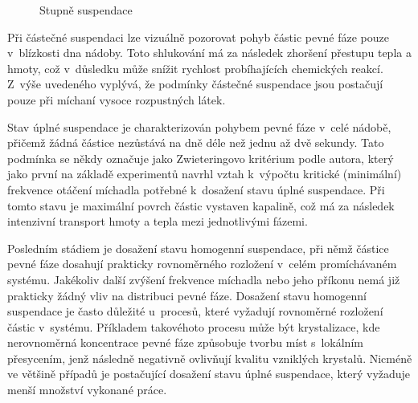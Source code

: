 \begin{figure}[h!]
  \qquad
  \caption{Stupně suspendace}
  \label{fig:typsus}
\end{figure}

Při částečné suspendaci lze vizuálně pozorovat pohyb částic pevné fáze pouze v~blízkosti dna nádoby. Toto shlukování má za následek zhoršení přestupu tepla a hmoty, což v~důsledku může snížit rychlost probíhajících chemických reakcí. Z~výše uvedeného vyplývá, že podmínky částečné suspendace jsou postačují pouze při míchaní vysoce rozpustných látek.

Stav úplné suspendace je charakterizován pohybem pevné fáze v~celé nádobě, přičemž žádná částice nezůstává na dně déle než jednu až dvě sekundy. Tato podmínka se někdy označuje jako Zwieteringovo kritérium podle autora, který jako první na základě experimentů navrhl vztah k~výpočtu kritické (minimální) frekvence otáčení míchadla potřebné k~dosažení stavu úplné suspendace. Při tomto stavu je maximální povrch částic vystaven kapalině, což má za následek intenzivní transport hmoty a tepla mezi jednotlivými fázemi.

Posledním stádiem je dosažení stavu homogenní suspendace, při němž částice pevné fáze dosahují prakticky rovnoměrného rozložení v~celém promíchávaném systému. Jakékoliv další zvýšení frekvence míchadla nebo jeho příkonu nemá již prakticky žádný vliv na distribuci pevné fáze. Dosažení stavu homogenní suspendace je často důležité u~procesů, které vyžadují rovnoměrné rozložení částic v~systému. Příkladem takovéhoto procesu může být krystalizace, kde nerovnoměrná koncentrace pevné fáze způsobuje tvorbu míst s~lokálním přesycením, jenž následně negativně ovlivňují kvalitu vzniklých krystalů. Nicméně ve většině případů je postačující dosažení stavu úplné suspendace, který vyžaduje menší množství vykonané práce.

